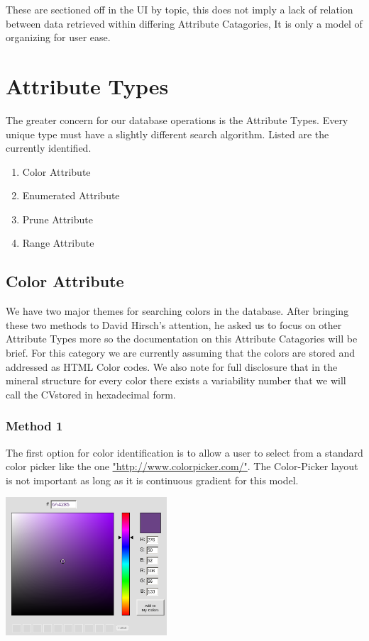 \documentclass{article}
\def \DH{David Hirsch\xspace}
\def \A{Attribute\xspace}
\def \AS{\A Catagories\xspace}
\def \AT{\A Types\xspace}
\def \ColA{Color Attribute\xspace}
\def \EnumA{Enumerated Attribute\xspace}
\def \RangeA{Range Attribute\xspace}
\def \PruneA{Prune Attribute\xspace}
\def \cv{CV}
\begin{document}
These are sectioned off in the UI by topic, this does not imply a lack of relation between data retrieved within differing \AS, It is only a model of organizing for user ease.

\section*{\AT}
The greater concern for our database operations is the \AT. Every unique type must have a slightly different search algorithm. Listed are the currently identified.

\begin{enumerate}
\item \ColA
\item \EnumA
\item \PruneA
\item \RangeA
\end{enumerate}


\subsection*{\ColA}
We have two major themes for searching colors in the database. After bringing these two methods to \DH's attention, he asked us to focus on other \AT more so the documentation on this \AS will be brief. For this category we are currently assuming that the colors are stored and addressed as HTML Color codes. We also note for full disclosure that in the mineral structure for every color there exists a variability number that we will call the \cv stored in hexadecimal form.


\subsubsection*{Method 1}
The first option for color identification is to allow a user to select from a standard color picker like the one \url{"http://www.colorpicker.com/"}. The Color-Picker layout is not important as long as it is continuous gradient for this model.

\begin{center}
\includegraphics[width=60mm]{colorpicker.png}
\end{center}
\end{document}
